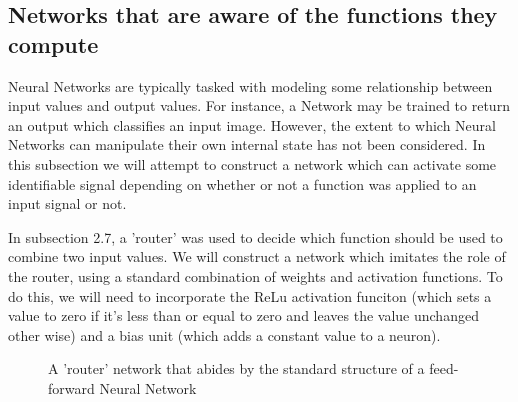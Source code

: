 \documentclass{article}
\begin{document}
	
	\subsection{Networks that are aware of the functions they compute}
	
		Neural Networks are typically tasked with modeling some relationship between input values and output values. For instance, a Network may be trained to return an output which classifies an input image. However, the extent to which Neural Networks can manipulate their own internal state has not been considered. In this subsection we will attempt to construct a network which can activate some identifiable signal depending on whether or not a function was applied to an input signal or not. 
		
		In subsection 2.7, a 'router' was used to decide which function should be used to combine two input values. We will construct a network which imitates the role of the router, using a standard combination of weights and activation functions. To do this, we will need to incorporate the ReLu activation funciton (which sets a value to zero if it's less than or equal to zero and leaves the value unchanged other wise) and a bias unit (which adds a constant value to a neuron). 
		
		\newpage
		\begin{figure}
			
			\centering
			
			\caption{A 'router' network that abides by the standard structure of a feed-forward Neural Network}
			
		\end{figure}
		
\end{document}

